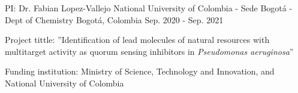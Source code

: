 \begin{cventries}
  \cventry
    {PI: Dr. Fabian Lopez-Vallejo} %
    {National University of Colombia - Sede Bogotá - Dept of Chemistry} %
    {Bogotá, Colombia} %
    {Sep. 2020 - Sep. 2021} %
    {
      \begin{cvitems} %
        \item {Project tittle: ''Identification of lead molecules of natural resources with multitarget activity as quorum sensing inhibitors in \textit{Pseudomonas aeruginosa}”}
        \item {Funding institution: Ministry of Science, Technology and Innovation, and National University of Colombia}
      \end{cvitems}
    }
\end{cventries}
